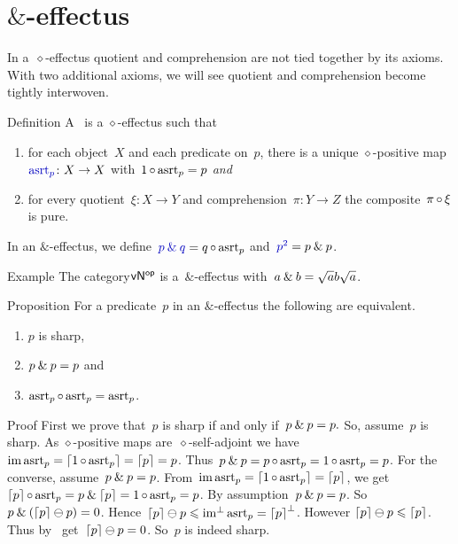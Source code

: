 \documentclass[b]{subfiles}
\begin{document}
\section{$\&$-effectus}
\begin{parsec}%
\begin{point}%
In a~$\diamond$-effectus
    quotient and comprehension are not tied together by its axioms.
    With two additional axioms, we will see quotient and comprehension
    become tightly interwoven. 
\end{point}
\begin{point}{Definition}%
A~
is a $\diamond$-effectus
such that
\begin{enumerate}
\item
    for each object~$X$
    and each predicate on~$p$,
    there is a unique $\diamond$-positive map~$\Define{\asrt_p}\colon X \to X$
    with~$1 \mathop{\circ} \mathrm{asrt}_p = p$ \emph{and}
\item
    for every quotient~$\xi \colon X \to Y$
    and comprehension~$\pi \colon Y \to Z$
    the composite~$\pi \mathop{\circ} \xi$ is pure.
\end{enumerate}
In an $\&$-effectus,
we define~$\Define{\andthen{p}{q}} = q \after \asrt_p$
    and~$\Define{p^2} = \andthen{p}{p}$.
\end{point}
\begin{point}{Example}%
The category${\mathsf{vN}}{^{\mathsf{op}}}$ is a~$\&$-effectus
    with~$a \mathbin{\&} b = \sqrt{a}b\sqrt{a}$. 
\end{point}
\begin{point}{Proposition}%
For a predicate~$p$ in an $\&$-effectus the following are equivalent.
\begin{enumerate}
\item $p$ is sharp,
\item $p \mathbin{\&} p=p$ and
\item $\mathrm{asrt}_p \mathop{\circ} \mathrm{asrt}_p = \mathrm{asrt}_p$.
\end{enumerate}
\begin{point}{Proof}%
First we prove that~$p$ is sharp if and only if~$p \mathbin{\&} p=p.$
So, assume~$p$ is sharp.
As $\diamond$-positive maps are~$\diamond$-self-adjoint
    we have~$\operatorname{im} \mathrm{asrt}_p = \left\lceil1 \mathop{\circ} \mathrm{asrt}_p\right\rceil = \left\lceil p\right\rceil = p$.
Thus~$p \mathbin{\&} p = p \mathop{\circ} \mathrm{asrt}_p = 1 \mathop{\circ} \mathrm{asrt}_p = p$.
For the converse, assume~$p \mathbin{\&} p=p$.
From~$\operatorname{im} \mathrm{asrt}_p = \left\lceil1 \mathop{\circ} \mathrm{asrt}_p\right\rceil = \left\lceil p\right\rceil$,
we get~$\left\lceil p\right\rceil \mathop{\circ} \mathrm{asrt}_p = p \mathbin{\&} \left\lceil p\right\rceil = 1 \mathop{\circ} \mathrm{asrt}_p = p$.
By assumption~$p \mathbin{\&} p=p$.
So~$p \mathbin{\&} (\left\lceil p\right\rceil \ominus p) = 0$.
Hence~$\left\lceil p\right\rceil\ominus p \leqslant \operatorname{im^\perp} \mathrm{asrt}_p = \left\lceil p\right\rceil^\perp$.
However $\left\lceil p\right\rceil\ominus p \leqslant \left\lceil p\right\rceil$.
Thus by~
    get~$\left\lceil p\right\rceil \ominus p = 0$. So~$p$ is indeed sharp.


\end{point}
\end{point}
\end{parsec}
\end{document}
